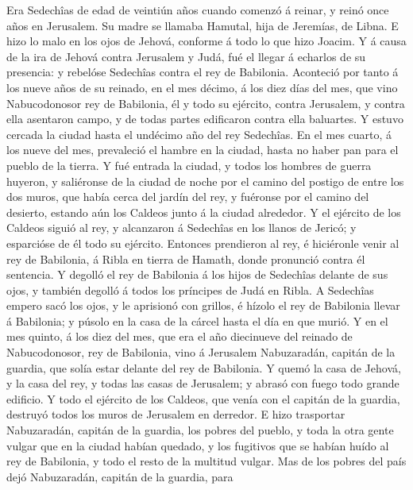  Era Sedechîas de edad de veintiún años cuando comenzó á
reinar, y reinó once años en Jerusalem. Su madre se llamaba Hamutal,
hija de Jeremías, de Libna.  E hizo lo malo en los ojos de
Jehová, conforme á todo lo que hizo Joacim.  Y á causa de la
ira de Jehová contra Jerusalem y Judá, fué el llegar á echarlos de su
presencia: y rebelóse Sedechîas contra el rey de Babilonia. 
Aconteció por tanto á los nueve años de su reinado, en el mes décimo, á
los diez días del mes, que vino Nabucodonosor rey de Babilonia, él y
todo su ejército, contra Jerusalem, y contra ella asentaron campo, y de
todas partes edificaron contra ella baluartes.  Y estuvo
cercada la ciudad hasta el undécimo año del rey Sedechîas. 
En el mes cuarto, á los nueve del mes, prevaleció el hambre en la
ciudad, hasta no haber pan para el pueblo de la tierra.  Y
fué entrada la ciudad, y todos los hombres de guerra huyeron, y
saliéronse de la ciudad de noche por el camino del postigo de entre los
dos muros, que había cerca del jardín del rey, y fuéronse por el camino
del desierto, estando aún los Caldeos junto á la ciudad alrededor.
 Y el ejército de los Caldeos siguió al rey, y alcanzaron á
Sedechîas en los llanos de Jericó; y esparcióse de él todo su ejército.
 Entonces prendieron al rey, é hiciéronle venir al rey de
Babilonia, á Ribla en tierra de Hamath, donde pronunció contra él
sentencia.  Y degolló el rey de Babilonia á los hijos de
Sedechîas delante de sus ojos, y también degolló á todos los príncipes
de Judá en Ribla.  A Sedechîas empero sacó los ojos, y le
aprisionó con grillos, é hízolo el rey de Babilonia llevar á Babilonia;
y púsolo en la casa de la cárcel hasta el día en que murió.
 Y en el mes quinto, á los diez del mes, que era el año
diecinueve del reinado de Nabucodonosor, rey de Babilonia, vino á
Jerusalem Nabuzaradán, capitán de la guardia, que solía estar delante
del rey de Babilonia.  Y quemó la casa de Jehová, y la casa
del rey, y todas las casas de Jerusalem; y abrasó con fuego todo grande
edificio.  Y todo el ejército de los Caldeos, que venía con
el capitán de la guardia, destruyó todos los muros de Jerusalem en
derredor.  E hizo trasportar Nabuzaradán, capitán de la
guardia, los pobres del pueblo, y toda la otra gente vulgar que en la
ciudad habían quedado, y los fugitivos que se habían huído al rey de
Babilonia, y todo el resto de la multitud vulgar.  Mas de
los pobres del país dejó Nabuzaradán, capitán de la guardia, para
